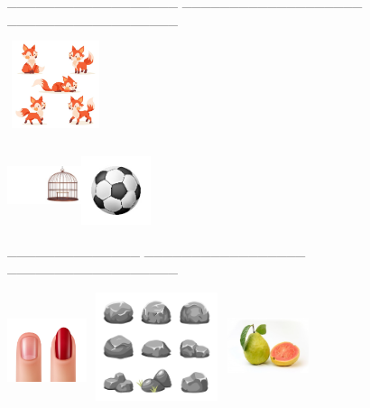 {{\_\_\_\_\_\_\_\_\_\_\_\_\_\_\_\_\_\_
\_\_\_\_\_\_\_\_\_\_\_\_\_\_\_\_\_\_\_
\_\_\_\_\_\_\_\_\_\_\_\_\_\_\_\_\_\_

\includegraphics[width=1.10833in,height=1.00903in]{media/image52.jpeg}

\includegraphics[width=0.85556in,height=0.92222in]{media/image53.jpeg}\includegraphics[width=0.79808in,height=0.79808in]{media/image54.jpeg}

\_\_\_\_\_\_\_\_\_\_\_\_\_\_ \_\_\_\_\_\_\_\_\_\_\_\_\_\_\_\_\_
\_\_\_\_\_\_\_\_\_\_\_\_\_\_\_\_\_\_


\includegraphics[width=0.91319in,height=1.16319in]{media/image55.jpeg}\includegraphics[width=1.62569in,height=1.25000in]{media/image56.jpeg}\includegraphics[width=0.93990in,height=1.27885in]{media/image57.jpeg}

}}
